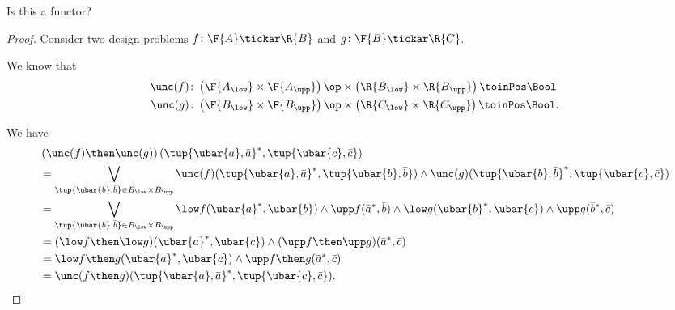 Is this a functor?

\begin{proof}
Consider two design problems $f\colon \F{A}\tickar \R{B}$ and $g\colon \F{B}\tickar \R{C}$. 

We know that
\begin{equation}
    \begin{aligned}
    \unc(f)&\colon \left( \F{A_{\low}}\times \F{A_{\upp}}\right)\op \times \left( \R{B_{\low}}\times \R{B_{\upp}}\right)\toinPos \Bool\\
    \unc(g)&\colon \left( \F{B_{\low}}\times \F{B_{\upp}}\right)\op \times \left( \R{C_{\low}}\times \R{C_{\upp}}\right)\toinPos \Bool.
    \end{aligned}
\end{equation}

We have
\begin{equation}
    \begin{aligned}
    &\left(\unc(f)\then \unc(g)\right) (\tup{\ubar{a},\bar{a}}^*,\tup{\ubar{c},\bar{c}})\\
    &=\bigvee_{\tup{\ubar{b},\bar{b}}\in B_{\low}\times B_{\upp}} \unc(f)(\tup{\ubar{a},\bar{a}}^*,\tup{\ubar{b},\bar{b}})\wedge \unc(g)(\tup{\ubar{b},\bar{b}}^*,\tup{\ubar{c},\bar{c}})\\
    &= \bigvee_{\tup{\ubar{b},\bar{b}}\in B_{\low}\times B_{\upp}} \low f(\ubar{a}^*,\ubar{b})\wedge \upp f(\bar{a}^*,\bar{b})\wedge \low g(\ubar{b}^*,\ubar{c})\wedge \upp g(\bar{b}^*,\bar{c})\\
    &=(\low f\then \low g)(\ubar{a}^*,\ubar{c})\wedge (\upp f\then \upp g)(\bar{a}^*,\bar{c})\\
    &=\low f\then g (\ubar{a}^*,\ubar{c})\wedge \upp f\then g(\bar{a}^*,\bar{c})\\
    &=\unc(f\then g)(\tup{\ubar{a},\bar{a}}^*,\tup{\ubar{c},\bar{c}}).
    \end{aligned}
\end{equation}
\end{proof}


